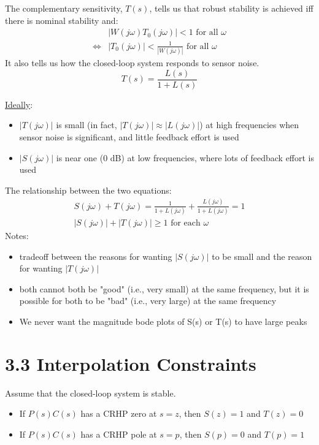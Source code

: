 The complementary sensitivity, \( T(s) \), tells us that robust stability is achieved iff there is nominal stability and:
\[
    \begin{aligned}
                        & | W(j\omega) T_0(j\omega) | < 1 \text{ for all } \omega               \\
        \Leftrightarrow & | T_0(j\omega) | < \frac{ 1 }{ |W(j\omega)| } \text{ for all } \omega
    \end{aligned}
\]
It also tells us how the closed-loop system responds to sensor noise.
\[T(s) = \frac{ L(s) }{ 1 + L(s) } \]

\underline{Ideally}:
\begin{itemize}
    \item \( |T(j\omega)| \) is small (in fact, \( |T(j\omega)| \approx |L(j\omega)| \)) at high frequencies when sensor noise is significant, and little feedback effort is used
    \item \( |S(j\omega)| \) is near one (0 dB) at low frequencies, where lots of feedback effort is used
\end{itemize}

The relationship between the two equations:
\begin{gather}
    S(j\omega) + T(j\omega) = \frac{ 1 }{ 1 + L(j\omega) } + \frac{ L(j\omega) }{ 1 + L(j\omega) } = 1 \\
    | S(j\omega) | + | T(j\omega) | \geq 1 \text{ for each } \omega
\end{gather}
Notes:
\begin{itemize}
    \item tradeoff between the reasons for wanting \( | S(j\omega) | \) to be small and the reason for wanting \( | T(j\omega) | \)
    \item both cannot both be "good" (i.e., very small) at the same frequency, but it is possible for both to be "bad" (i.e., very large) at the same frequency
    \item We never want the magnitude bode plots of S(s) or T(s) to have large peaks
\end{itemize}

\section*{3.3 Interpolation Constraints}
Assume that the closed-loop system is stable.
\begin{itemize}
    \item If \( P(s)C(s) \) has a CRHP zero at \( s = z \), then \( S(z) = 1 \) and \( T(z) = 0 \)
    \item If \( P(s)C(s) \) has a CRHP pole at \( s = p \), then \( S(p) = 0 \) and \( T(p) = 1 \)
\end{itemize}

